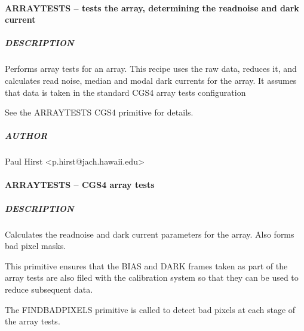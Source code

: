 \documentclass[twoside,11pt]{article}
\renewcommand{\_}{\texttt{\symbol{95}}}
\begin{document}
\paragraph*{ARRAY\_TESTS -- tests the array, determining the readnoise and dark current\label{ARRAY_TESTS_--_tests_the_array_determining_the_readnoise_and_dark_current}}



\subparagraph*{DESCRIPTION\label{ARRAY_TESTS_--_tests_the_array_determining_the_readnoise_and_dark_current_DESCRIPTION}}

Performs array tests for an array. This recipe uses the raw data,
reduces it, and calculates read noise, median and modal dark currents
for the array. It assumes that data is taken in the standard CGS4
array tests configuration



See the \_ARRAY\_TESTS\_ CGS4 primitive for details.

\subparagraph*{AUTHOR\label{ARRAY_TESTS_--_tests_the_array_determining_the_readnoise_and_dark_current_AUTHOR}}

Paul Hirst <p.hirst@jach.hawaii.edu>


\paragraph*{\_ARRAY\_TESTS\_ -- CGS4 array tests\label{_ARRAY_TESTS_--_CGS4_array_tests}}



\subparagraph*{DESCRIPTION\label{_ARRAY_TESTS_--_CGS4_array_tests_DESCRIPTION}}

Calculates the readnoise and dark current parameters for the array.
Also forms bad pixel masks.



This primitive ensures that the BIAS and DARK frames taken as part of
the array tests are also filed with the calibration system so that
they can be used to reduce subsequent data.



The \_FIND\_BAD\_PIXELS\_ primitive is called to detect bad pixels at each
stage of the array tests.
\end{document}
